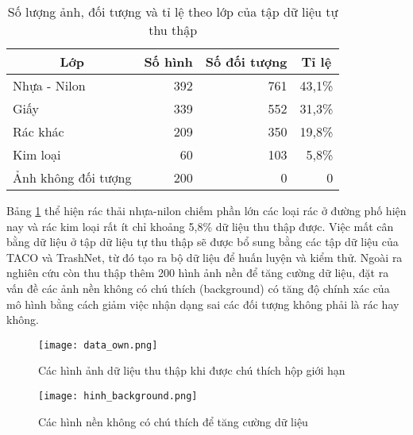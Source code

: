 \documentclass[../the.tex]{subfiles}
\begin{document}
\begin{table}[!ht]
	\centering
	\caption{Số lượng ảnh, đối tượng và tỉ lệ theo lớp của tập dữ liệu tự thu thập}
	\begin{tabular}{|l|r|r|r|}
		\hline
		\multicolumn{1}{|c|}{\textbf{Lớp}}
		                  & \multicolumn{1}{c|}{\textbf{Số hình}}
		                  & \multicolumn{1}{c|}{\textbf{Số đối tượng}}
		                  & \multicolumn{1}{c|}{\textbf{Tỉ lệ}}
		\\
		\hline

		Nhựa - Nilon      & 392                                        & 761 & 43,1\% \\
		\hline

		Giấy              & 339                                        & 552 & 31,3\% \\
		\hline

		Rác khác          & 209                                        & 350 & 19,8\% \\
		\hline

		Kim loại          & 60                                         & 103 & 5,8\%  \\
		\hline
		Ảnh không đối tượng & 200                                        & 0   & 0      \\
		\hline
	\end{tabular}

	\label{tab:datasetown}
\end{table}

{\fontsize{13}{12} \selectfont

Bảng \ref{tab:datasetown} thể hiện rác thải nhựa-nilon chiếm phần lớn các loại rác ở đường phố hiện nay và rác kim loại rất ít chỉ khoảng 5,8\% dữ liệu thu thập được.
Việc mất cân bằng dữ liệu ở tập dữ liệu tự thu thập sẽ được bổ sung bằng các tập dữ liệu của TACO và TrashNet, từ đó tạo ra bộ dữ liệu để huấn luyện và kiểm thử.
Ngoài ra nghiên cứu còn thu thập thêm 200 hình ảnh nền để tăng cường dữ liệu, đặt ra vấn đề các ảnh nền không có chú thích (background) có tăng độ chính xác của mô hình bằng cách giảm việc nhận dạng sai các đối tượng không phải là rác hay không.

}


\begin{figure}[H]
	\centering
	\texttt{[image: data\_own.png]}
	\caption{Các hình ảnh dữ liệu thu thập khi được chú thích hộp giới hạn}
	\label{fig:dataset_own}
\end{figure}

\begin{figure}[H]
	\centering
	\texttt{[image: hinh\_background.png]}
	\caption{Các hình nền không có chú thích để tăng cường dữ liệu}
	\label{fig:dataset_bg}
\end{figure}
\end{document}

